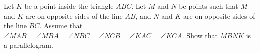 Let $ K$ be a point inside the triangle $ ABC$. Let $ M$ and $ N$ be points such that $ M$ and $ K$ are on opposite sides of the line $ AB$,  and $ N$ and $ K$ are on opposite sides of the line $ BC$. Assume that $ \angle MAB = \angle MBA = \angle NBC = \angle NCB = \angle KAC = \angle KCA$. Show that $ MBNK$ is a parallelogram.